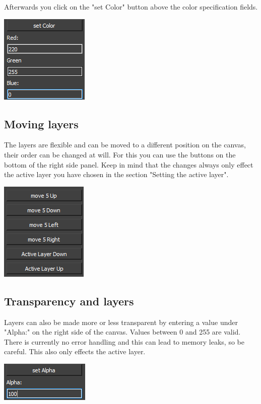 \documentclass[a4paper, 12pt]{article}
\begin{document}
Afterwards you click on the "set Color" button above the color specification fields.
\begin{center}
\includegraphics[width=0.3\linewidth,keepaspectratio]{assets/fill-layer}
\end{center}

\subsection{Moving layers}
The layers are flexible and can be moved to a different position on the canvas, their order can be changed at will. For this you can use the buttons on the bottom of the right side panel. Keep in mind that the changes always only effect the active layer you have chosen in the section "Setting the active layer".

\begin{center}
\includegraphics[width=0.3\linewidth,keepaspectratio]{assets/moving-layers}
\end{center}

\subsection{Transparency and layers}
Layers can also be made more or less transparent by entering a value under "Alpha:" on the right side of the canvas. Values between 0 and 255 are valid. There is currently no error handling and this can lead to memory leaks, so be careful. This also only effects the active layer.

\begin{center}
\includegraphics[width=0.3\linewidth,keepaspectratio]{assets/layer-alpha}
\end{center}
\end{document}
